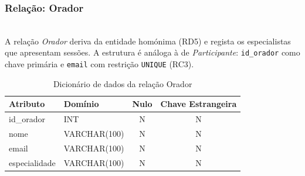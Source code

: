 \documentclass[runningheads]{llncs}
\begin{document}
                \vspace{0.3cm}
                \noindent\begin{minipage}{\textwidth}
                \subsubsection{Relação: Orador}\mbox{}\\

                A relação \textit{Orador} deriva da entidade homónima (RD5) e regista os
                especialistas que apresentam sessões. A estrutura é análoga à de
                \textit{Participante}: \texttt{id\_orador} como chave primária e
                \texttt{email} com restrição \texttt{UNIQUE} (RC3).

                \begin{table}[H]
                \centering
                \renewcommand{\arraystretch}{1.4}
                \begin{tabular}{|l|l|c|c|}
                \hline
                \textbf{Atributo} & \textbf{Domínio} & \textbf{Nulo} & \textbf{Chave Estrangeira} \\ \hline
                id\_orador    & INT          & N & N \\ \hline
                nome          & VARCHAR(100) & N & N \\ \hline
                email         & VARCHAR(100) & N & N \\ \hline
                especialidade & VARCHAR(100) & N & N \\ \hline
                \end{tabular}
                \vspace{0.2cm}
                \caption{Dicionário de dados da relação Orador}
                \label{tab:dic_orador}
                \end{table}
                \end{minipage}
\end{document}
